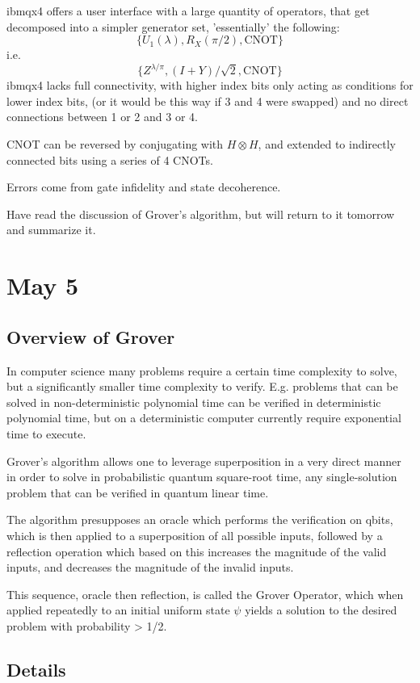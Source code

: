 \documentclass[]{article}
\begin{document}
ibmqx4 offers a user interface with a large quantity of operators, that get decomposed into a simpler generator set, 'essentially' the following:
\[\{U_1(\lambda), R_X(\pi/2), \text{CNOT}\}\]
i.e.
\[\{Z^{\lambda/\pi}, (I+Y)/\sqrt{2}, \text{CNOT}\}\]
ibmqx4 lacks full connectivity, with higher index bits only acting as conditions for lower index bits, (or it would be this way if 3 and 4 were swapped) and no direct connections between 1 or 2 and 3 or 4.

CNOT can be reversed by conjugating with $H\otimes H$, and extended to indirectly connected bits using a series of 4 CNOTs.

Errors come from gate infidelity and state decoherence.

Have read the discussion of Grover's algorithm, but will return to it tomorrow and summarize it.

\section{May 5}

\subsection{Overview of Grover}

In computer science many problems require a certain time complexity to solve, but a significantly smaller time complexity to verify. E.g. problems that can be solved in non-deterministic polynomial time can be verified in deterministic polynomial time, but on a deterministic computer currently require exponential time to execute.

Grover's algorithm allows one to leverage superposition in a very direct manner in order to solve in probabilistic quantum square-root time, any single-solution problem that can be verified in quantum linear time.

The algorithm presupposes an oracle which performs the verification on qbits, which is then applied to a superposition of all possible inputs, followed by a reflection operation which based on this increases the magnitude of the valid inputs, and decreases the magnitude of the invalid inputs.

This sequence, oracle then reflection, is called the Grover Operator, which when applied repeatedly to an initial uniform state $\psi$ yields a solution to the desired problem with probability > 1/2.

\subsection{Details}
\end{document}
